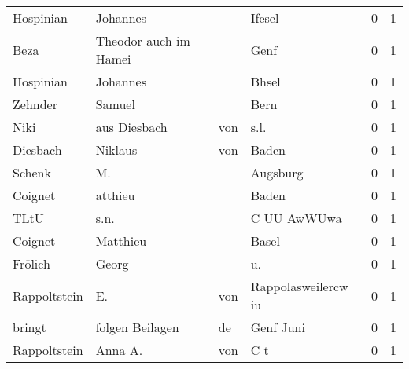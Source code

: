 \documentclass[10pt,a4paper,landscape]{article}
\begin{document}
\begin{longtable}{llllrr}
                Hospinian &                           Johannes &             &                                      Ifesel &          0 &         1 \\
                     Beza &              Theodor auch im Hamei &             &                                        Genf &          0 &         1 \\
                Hospinian &                           Johannes &             &                                       Bhsel &          0 &         1 \\
                  Zehnder &                             Samuel &             &                                        Bern &          0 &         1 \\
                     Niki &                      aus  Diesbach &         von &                                        s.l. &          0 &         1 \\
                 Diesbach &                            Niklaus &         von &                                       Baden &          0 &         1 \\
                   Schenk &                                 M. &             &                                    Augsburg &          0 &         1 \\
                  Coignet &                            atthieu &             &                                       Baden &          0 &         1 \\
                     TLtU &                               s.n. &             &                                 C UU AwWUwa &          0 &         1 \\
                  Coignet &                           Matthieu &             &                                       Basel &          0 &         1 \\
                  Frölich &                              Georg &             &                                         u.  &          0 &         1 \\
             Rappoltstein &                                 E. &         von &                         Rappolasweilercw iu &          0 &         1 \\
                   bringt &                    folgen Beilagen &          de &                                   Genf Juni &          0 &         1 \\
             Rappoltstein &                            Anna A. &         von &                                         C t &          0 &         1 \\

\end{longtable}
\end{document}
